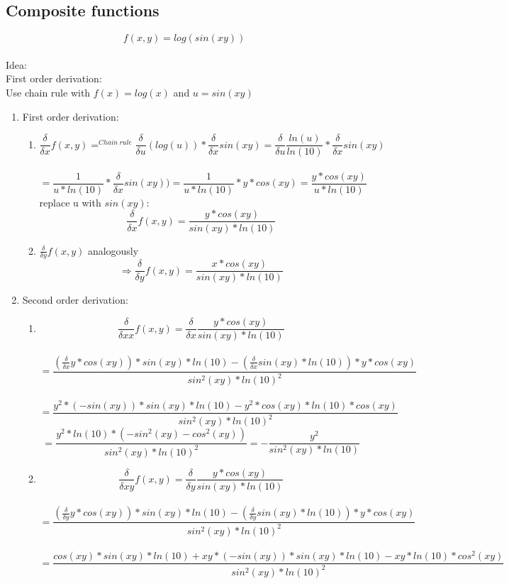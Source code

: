 \documentclass[12pt]{article}
\begin{document}
\subsection{Composite functions}
	$$f(x,y)=log(sin(xy))$$\\
		Idea:\\
		First order derivation:\\
		Use chain rule with $f(x)=log(x)$ and $u=sin(xy)$
	\begin{enumerate}
		\item
		First order derivation:\\
		\begin{enumerate}
		\item
		$$ \frac{\delta}{\delta x} f(x,y)=^{Chain~rule} \frac{\delta}{\delta u}(log(u))* \frac{\delta}{\delta x} sin(xy)
			= \frac{\delta}{\delta u}\frac{ln(u)}{ln(10)} * \frac{\delta}{\delta x} sin(xy) $$ \\
		$$	= \frac{1}{u*ln(10)} * \frac{\delta}{\delta x} sin(xy)) 
			= \frac{1}{u*ln(10)} * y * cos(xy) = \frac{y*cos(xy)}{u*ln(10)} $$
		replace u with $sin(xy)$:
		$$ \frac{\delta}{\delta x} f(x,y) = \frac{y*cos(xy)}{sin(xy)*ln(10)} $$
		
		\item
		$ \frac{\delta}{\delta y} f(x,y)$ analogously \\
		$$ \Rightarrow \frac{\delta}{\delta y} f(x,y) = \frac{x*cos(xy)}{sin(xy)*ln(10)} $$
		
		\end{enumerate}
		
		\item		
		Second order derivation:\\
		\begin{enumerate}
			\item
			$$  \frac{\delta}{\delta xx} f(x,y) =  \frac{\delta}{\delta x} \frac{y*cos(xy)}{sin(xy)*ln(10)}$$\\
			$$ = \frac{(\frac{\delta}{\delta x}y*cos(xy))*sin(xy)*ln(10)-(\frac{\delta}{\delta x} sin(xy)*ln(10))*y*cos(xy)}{sin^2(xy)*ln(10)^2} $$\\
			$$ = \frac{y^2 * (-sin(xy))*sin(xy)*ln(10)-y^2*cos(xy)*ln(10)*cos(xy)}{sin^2(xy)*ln(10)^2}$$
			$$ = \frac{y^2*ln(10)*(-sin^2(xy)-cos^2(xy))}{sin^2(xy)*ln(10)^2} = -\frac{y^2}{sin^2(xy)*ln(10)} $$
		
			\item
			$$  \frac{\delta}{\delta xy} f(x,y) =  \frac{\delta}{\delta y} \frac{y*cos(xy)}{sin(xy)*ln(10)}$$\\
			$$ = \frac{(\frac{\delta}{\delta y}y*cos(xy))*sin(xy)*ln(10)-(\frac{\delta}{\delta y} sin(xy)*ln(10))*y*cos(xy)}{sin^2(xy)*ln(10)^2} $$\\
			$$ = \frac{cos(xy)*sin(xy)*ln(10)+ xy*(-sin(xy))*sin(xy)*ln(10) - xy *ln(10) *cos^2(xy)}{sin^2(xy)*ln(10)^2} $$
			

\end{enumerate}
\end{enumerate}
\end{document}
